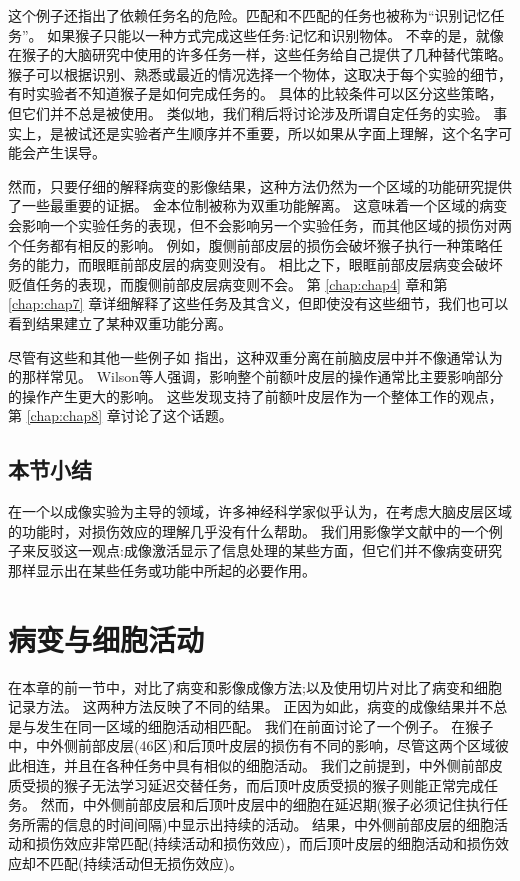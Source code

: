 \par
这个例子还指出了依赖任务名的危险。匹配和不匹配的任务也被称为“识别记忆任务”。
如果猴子只能以一种方式完成这些任务:记忆和识别物体。
不幸的是，就像在猴子的大脑研究中使用的许多任务一样，这些任务给自己提供了几种替代策略。
猴子可以根据识别、熟悉或最近的情况选择一个物体，这取决于每个实验的细节，有时实验者不知道猴子是如何完成任务的。
具体的比较条件可以区分这些策略，但它们并不总是被使用。
类似地，我们稍后将讨论涉及所谓自定任务的实验。
事实上，是被试还是实验者产生顺序并不重要，所以如果从字面上理解，这个名字可能会产生误导。


\par
然而，只要仔细的解释病变的影像结果，这种方法仍然为一个区域的功能研究提供了一些最重要的证据。
金本位制被称为双重功能解离。
这意味着一个区域的病变会影响一个实验任务的表现，但不会影响另一个实验任务，而其他区域的损伤对两个任务都有相反的影响。
例如，腹侧前部皮层的损伤会破坏猴子执行一种策略任务的能力\cite{baxter2009ventrolateral}，而眼眶前部皮层的病变则没有\cite{baxter2007asymmetry,baxter2007orbital}。
相比之下，眼眶前部皮层病变会破坏贬值任务的表现\cite{izquierdo2004bilateral}，而腹侧前部皮层病变则不会\cite{baxter2009ventrolateral}。
第 \ref{chap:chap4} 章和第 \ref{chap:chap7} 章详细解释了这些任务及其含义，但即使没有这些细节，我们也可以看到结果建立了某种双重功能分离。


\par
尽管有这些和其他一些例子如 \cite{gaffan2002interaction}指出，这种双重分离在前脑皮层中并不像通常认为的那样常见。
Wilson等人\cite{wilson2010functional}强调，影响整个前额叶皮层的操作通常比主要影响部分的操作产生更大的影响。
这些发现支持了前额叶皮层作为一个整体工作的观点，第 \ref{chap:chap8} 章讨论了这个话题。


\subsection{本节小结}

在一个以成像实验为主导的领域，许多神经科学家似乎认为，在考虑大脑皮层区域的功能时，对损伤效应的理解几乎没有什么帮助。
我们用影像学文献中的一个例子来反驳这一观点:成像激活显示了信息处理的某些方面，但它们并不像病变研究那样显示出在某些任务或功能中所起的必要作用。


\section{病变与细胞活动}

在本章的前一节中，对比了病变和影像成像方法;以及使用切片对比了病变和细胞记录方法。
这两种方法反映了不同的结果。
正因为如此，病变的成像结果并不总是与发生在同一区域的细胞活动相匹配。
我们在前面讨论了一个例子。
在猴子中，中外侧前部皮层(46区)和后顶叶皮层的损伤有不同的影响，尽管这两个区域彼此相连，并且在各种任务中具有相似的细胞活动。
我们之前提到，中外侧前部皮质受损的猴子无法学习延迟交替任务，而后顶叶皮质受损的猴子则能正常完成任务。
然而，中外侧前部皮层\cite{KOJIMA1984229}和后顶叶皮层\cite{chafee1998matching}中的细胞在延迟期(猴子必须记住执行任务所需的信息的时间间隔)中显示出持续的活动。
结果，中外侧前部皮层的细胞活动和损伤效应非常匹配(持续活动和损伤效应)，而后顶叶皮层的细胞活动和损伤效应却不匹配(持续活动但无损伤效应)。


